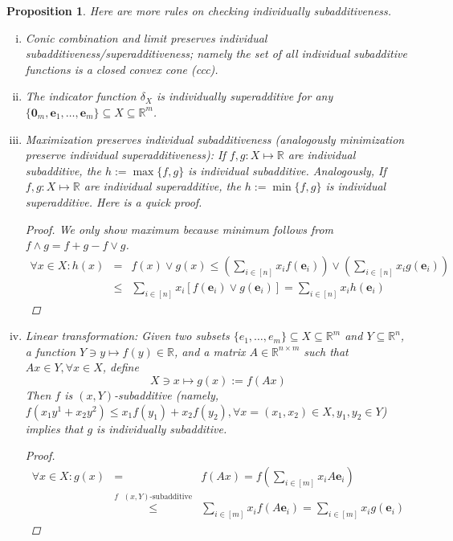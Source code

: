 \documentclass[11pt]{article}\usepackage[]{graphicx}\usepackage[]{xcolor}
\newtheorem{prop}{Proposition}
\begin{document}
\begin{prop}\label{prop:id-sub} Here are more rules on checking individually subadditiveness.
\begin{enumerate}[(i)]
\item Conic combination and limit preserves individual subadditiveness/superadditiveness; namely the set of all individual subadditive functions is a closed convex cone (ccc).

\item The indicator function $\delta_X$ is individually superadditive for any $\{\mathbf{0}_m, \mathbf{e}_1,\dots, \mathbf{e}_m\}\subseteq X\subseteq \mathbb{R}^m$.


\item Maximization preserves individual subadditiveness (analogously minimization preserve individual superadditiveness):  If $f, g: X\mapsto \mathbb{R}$ are individual subadditive, the $h:=\max\{f, g\}$ is individual subadditive. Analogously, If $f, g: X\mapsto \mathbb{R}$ are individual superadditive, the $h:=\min\{f, g\}$ is individual superadditive. Here is a quick proof. 
\begin{proof} We only show maximum because minimum follows from $f\wedge g=f+g-f\vee g$. 
\begin{eqnarray*}
\forall x\in X: h(x)&=&f(x)\vee g(x)\le\left(\sum_{i\in [n]}x_if(\mathbf{e}_i)\right)\vee \left(\sum_{i\in [n]}x_ig(\mathbf{e}_i)\right)\\
&\le& \sum_{i\in [n]}x_i [f(\mathbf{e}_i)\vee g(\mathbf{e}_i)]=\sum_{i\in [n]}x_i h(\mathbf{e}_i)
\end{eqnarray*}
\end{proof}



\item Linear transformation: Given two subsets $\{e_1,\dots, e_m\}\subseteq X\subseteq \mathbb{R}^m$ and $Y\subseteq \mathbb{R}^n$, a function $Y\ni y\mapsto f(y)\in\mathbb{R}$, and a matrix $A\in\mathbb{R}^{n\times m}$ such that $Ax\in Y, \forall x\in X$, define 
\[
X\ni x\mapsto g(x):=f(Ax)
\]
Then $f$ is $(x, Y)$-subadditive (namely, $f(x_1y^1+x_2y^2)\le x_1f(y_1)+x_2f(y_2), \forall x=(x_1, x_2)\in X, y_1, y_2\in Y$) implies that $g$ is individually subadditive.
\begin{proof}
\begin{eqnarray*}
\forall x\in X: g(x) &=&f(Ax)=f\left(\sum_{i\in [m]}x_iA\mathbf{e}_i\right)\\
&\overset{f \text{ $(x, Y)$-subadditive}}{\le}& \sum_{i\in [m]}x_if\left(A\mathbf{e}_i\right)=\sum_{i\in [m]}x_i g(\mathbf{e}_i)
 \end{eqnarray*}
\end{proof}


\end{enumerate}
\end{prop}
\end{document}
